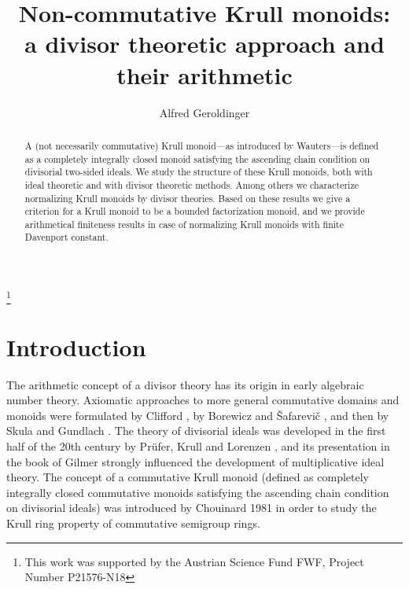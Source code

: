 \documentclass[a4paper]{amsart}
\theoremstyle{definition}
\numberwithin{equation}{section}
\begin{document}
\address{Institut f\"ur Mathematik und Wissenschaftliches Rechnen \\
Karl-Franzens-Universit\"at Graz \\
Heinrichstra\ss e 36\\
8010 Graz, Austria} 

\author{Alfred Geroldinger}

\thanks{This work was supported by
the Austrian Science Fund FWF, Project Number P21576-N18}



\begin{abstract}
A (not necessarily commutative) Krull monoid---as introduced by
Wauters---is defined as a completely integrally closed monoid
satisfying the ascending chain condition on  divisorial two-sided
ideals. We study the structure of these Krull monoids, both with
ideal theoretic and with divisor theoretic methods. Among others we
characterize normalizing Krull monoids by divisor theories. Based on
these results we give a criterion for a  Krull monoid to be a
bounded factorization monoid, and we provide arithmetical finiteness
results in case of normalizing Krull monoids with finite Davenport
constant.
\end{abstract}

\title[Non-commutative  Krull monoids:  a divisor theoretic approach]{Non-commutative  Krull monoids: \\ a divisor theoretic approach and their arithmetic}

\maketitle

\bigskip
\section{Introduction}
\bigskip

The arithmetic concept of a divisor theory has its origin in early
algebraic number theory. Axiomatic approaches to more general
commutative domains and monoids were formulated by Clifford
\cite{Cl38}, by Borewicz and \v{S}afarevi\v{c} \cite{Bo-Sa66}, and
then by Skula \cite{Sk70} and Gundlach \cite{Gu72}. The theory of
divisorial ideals was developed in the first half of the 20th
century by Pr\"ufer, Krull and Lorenzen \cite{Pr32, Kr36r, Kr36f,
Kr37, Lo39}, and its presentation in the book of  Gilmer
\cite{Gi72a} strongly influenced the development of multiplicative
ideal theory. The concept of a commutative Krull monoid (defined as
completely integrally closed commutative monoids satisfying the
ascending chain condition on divisorial ideals) was introduced by
Chouinard \cite{Ch81}  1981 in order to study the Krull ring
property of commutative semigroup rings.
\end{document}
